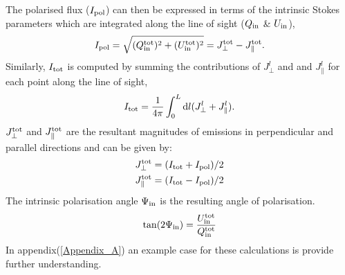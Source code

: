 \documentclass[usenatbib]{mnras}
\newcommand{\Andrew}[1]{\textcolor{dg}{#1}}
\newcommand{\Vasu}[1]{{\color{purple}#1}}
\begin{document}
The polarised flux ($I_{\rm pol}$) can then be expressed in terms of the intrinsic Stokes parameters which are integrated along the line of sight (${Q_{\rm in}}$ \& ${U_{\rm in}}$),
\begin{eqnarray} \label{eq_I_pol}
I_{\rm pol} = \sqrt{(Q_{\rm in}^{\rm tot})^2+(U_{\rm in}^{\rm tot})^2} = J_{\perp}^{\rm tot} - J_{\parallel}^{\rm tot}.
\end{eqnarray}
Similarly, $I_{\rm tot}$ is computed by summing the contributions of $J_{\perp}^l$ and and $J_{\parallel}^l$ for each point along the line of sight,
\begin{equation} \label{eq_I_tot}
    I_{\rm tot} = \frac{1}{4\pi} \int_0^L \mathrm{d}l (J_{\perp}^l + J_{\parallel}^l).
\end{equation}
$J_{\perp}^{\rm tot}$ and $J_{\parallel}^{\rm tot}$ are the resultant magnitudes of emissions in perpendicular and parallel directions and can be given by:
\begin{eqnarray}
J_{\perp}^{\rm tot} = (I_{\rm tot} + I_{\rm pol})/2 \\
J_{\parallel}^{\rm tot} = (I_{\rm tot} - I_{\rm pol})/2 
\end{eqnarray}
The intrinsic polarisation angle $\Psi_{\rm in}$ is the resulting angle of polarisation.%
\begin{eqnarray}
\tan(2\Psi_{\rm in}) = \frac{U_{\rm in}^{\rm tot}}{Q_{\rm in}^{\rm tot}} 
\end{eqnarray}
In appendix(\ref{Appendix_A}) an example case for these calculations is provide further understanding.

\end{document}
